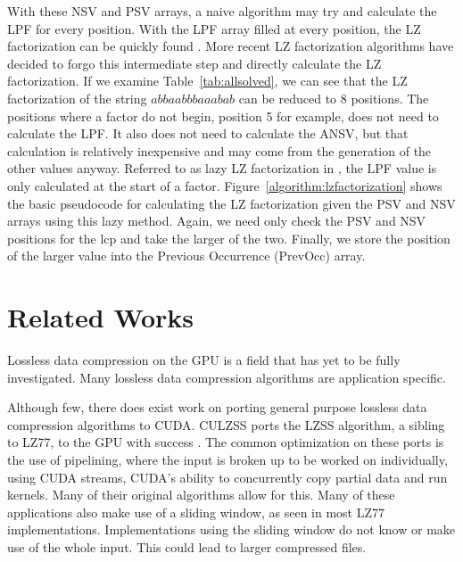 With these NSV and PSV arrays, a naive algorithm may try and calculate the LPF for every position.
With the LPF array filled at every position, the LZ factorization can be quickly found \cite{crochemore2008computing}.
More recent LZ factorization algorithms have decided to forgo this intermediate step and directly calculate the LZ factorization.
If we examine Table~\ref{tab:allsolved}, we can see that the LZ factorization of the string $abbaabbbaaabab$ can be reduced to 8 positions.
The positions where a factor do not begin, position 5 for example, does not need to calculate the LPF.
It also does not need to calculate the ANSV, but that calculation is relatively inexpensive and may come from the generation of the other values anyway.
Referred to as lazy LZ factorization in \cite{karkkainen2013linear}, the LPF value is only calculated at the start of a factor.
Figure~\ref{algorithm:lzfactorization} shows the basic pseudocode for calculating the LZ factorization given the PSV and NSV arrays using this lazy method.
Again, we need only check the PSV and NSV positions for the lcp and take the larger of the two.
Finally, we store the position of the larger value into the Previous Occurrence (PrevOcc) array.


\section{Related Works}

Lossless data compression on the GPU is a field that has yet to be fully investigated.
Many lossless data compression algorithms are application specific.

Although few, there does exist work on porting general purpose lossless data compression algorithms to CUDA.
CULZSS ports the LZSS algorithm, a sibling to LZ77, to the GPU with success \cite{ozsoy2011culzss}.
The common optimization on these ports is the use of pipelining, where the input is broken up to be worked on individually, using CUDA streams, CUDA's ability to concurrently copy partial data and run kernels.
Many of their original algorithms allow for this.
Many of these applications also make use of a sliding window, as seen in most LZ77 implementations.
Implementations using the sliding window do not know or make use of the whole input.
This could lead to larger compressed files.


